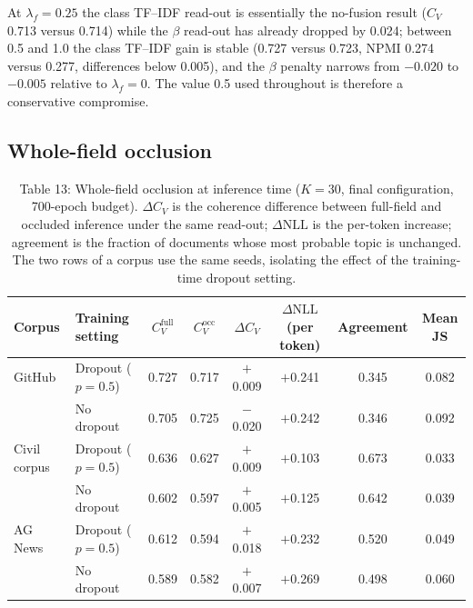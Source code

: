 \documentclass{article}
\begin{document}
At $\lambda_f=0.25$ the class TF--IDF read-out is essentially the no-fusion result ($C_V$ 0.713
versus 0.714) while the $\beta$ read-out has already dropped by 0.024; between 0.5 and 1.0 the
class TF--IDF gain is stable (0.727 versus 0.723, NPMI 0.274 versus 0.277, differences below
0.005), and the $\beta$ penalty narrows from $-0.020$ to $-0.005$ relative to $\lambda_f=0$.
The value 0.5 used throughout is therefore a conservative compromise.

\subsection{Whole-field occlusion}

\begin{table}[t]
\centering
\caption{Table 13: Whole-field occlusion at inference time ($K=30$, final configuration, 700-epoch budget). $\Delta C_V$ is the coherence difference between full-field and occluded inference under the same read-out; $\Delta\mathrm{NLL}$ is the per-token increase; agreement is the fraction of documents whose most probable topic is unchanged. The two rows of a corpus use the same seeds, isolating the effect of the training-time dropout setting.}
\label{tab:occlusion}
\small
\setlength{\tabcolsep}{4pt}
\begin{tabular}{llcccccc}
\toprule
Corpus & Training setting & $C_V^{\mathrm{full}}$ & $C_V^{\mathrm{occ}}$ & $\Delta C_V$
 & $\Delta\mathrm{NLL}$(per token) & Agreement & Mean JS \\
\midrule
GitHub & Dropout ($p=0.5$) & 0.727 & 0.717 & $+$0.009 & $+$0.241 & 0.345 & 0.082 \\
       & No dropout & 0.705 & 0.725 & $-$0.020 & $+$0.242 & 0.346 & 0.092 \\
\midrule
Civil corpus & Dropout ($p=0.5$) & 0.636 & 0.627 & $+$0.009 & $+$0.103 & 0.673 & 0.033 \\
        & No dropout & 0.602 & 0.597 & $+$0.005 & $+$0.125 & 0.642 & 0.039 \\
\midrule
AG News & Dropout ($p=0.5$) & 0.612 & 0.594 & $+$0.018 & $+$0.232 & 0.520 & 0.049 \\
        & No dropout & 0.589 & 0.582 & $+$0.007 & $+$0.269 & 0.498 & 0.060 \\
\bottomrule
\end{tabular}
\end{table}
\end{document}
